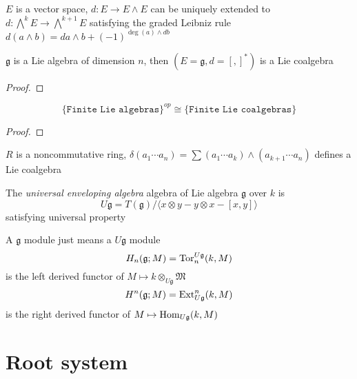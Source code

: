 \documentclass[main]{subfiles}
\begin{document}
\begin{definition}
$E$ is a vector space, $d:E\to E\wedge E$ can be uniquely extended to $d:\bigwedge^kE\to\bigwedge^{k+1}E$ satisfying the graded Leibniz rule $d(a\wedge b)=da\wedge b+(-1)^{\deg(a)\wedge db}$
\end{definition}

\begin{lemma}
$\mathfrak g$ is a Lie algebra of dimension $n$, then $(E=\mathfrak g,d=[,]^*)$ is a Lie coalgebra
\end{lemma}

\begin{proof}

\end{proof}

\begin{proposition}
\[\{\texttt{Finite Lie algebras}\}^{op} \cong \{\texttt{Finite Lie coalgebras}\}\]
\end{proposition}

\begin{proof}

\end{proof}

\begin{example}
$R$ is a noncommutative ring, $\delta(a_1\cdots a_n)=\sum (a_1\cdots a_k)\wedge (a_{k+1}\cdots a_n)$ defines a Lie coalgebra
\end{example}

\begin{definition}
The \textit{universal enveloping algebra} algebra of Lie algebra $\mathfrak g$ over $k$ is
\[U\mathfrak g=T(\mathfrak g)/\langle x\otimes y-y\otimes x-[x,y]\rangle\]
satisfying universal property
\end{definition}

\begin{definition}
A $\mathfrak{g}$ module just means a $U\mathfrak g$ module
\[H_n(\mathfrak g;M)=\operatorname{Tor}_n^{U\mathfrak g}(k,M)\]
is the left derived functor of $M\mapsto k\otimes_{U\mathfrak g}\mathfrak M$
\[H^n(\mathfrak g;M)=\operatorname{Ext}^n_{U\mathfrak g}(k,M)\]
is the right derived functor of $M\mapsto \operatorname{Hom}_{U\mathfrak g}(k,M)$
\end{definition}



\section{Root system}
\end{document}
